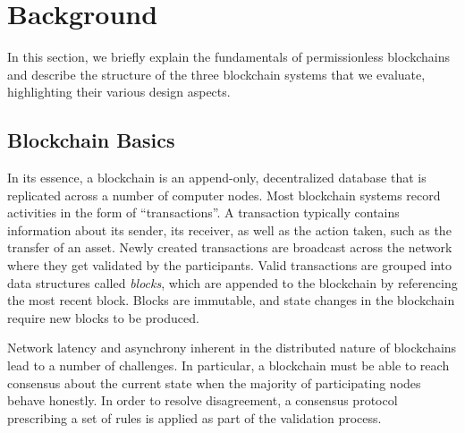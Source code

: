 \section{Background}
\label{sec:background}

In this section, we briefly explain the fundamentals of permissionless blockchains and describe the structure of the three blockchain systems that we evaluate, highlighting their various design aspects. 

\subsection{Blockchain Basics}
In its essence, a blockchain is an append-only, decentralized database that is replicated across a number of computer nodes. 
Most blockchain systems record activities in the form of ``transactions''. 
A transaction typically contains information about its sender, its receiver, as well as the action taken, such as the transfer of an asset. 
Newly created transactions are broadcast across the network where they get validated by the participants. 
Valid transactions are grouped into data structures called \textit{blocks}, which are appended to the blockchain by referencing the most recent block.
Blocks are immutable, and state changes in the blockchain require new blocks to be produced.

Network latency and asynchrony inherent in the distributed nature of blockchains lead to a number of challenges. 
In particular, a blockchain must be able to reach consensus about the current state when the majority of participating nodes behave honestly. 
In order to resolve disagreement, a consensus protocol prescribing a set of rules is applied as part of the validation process. 


